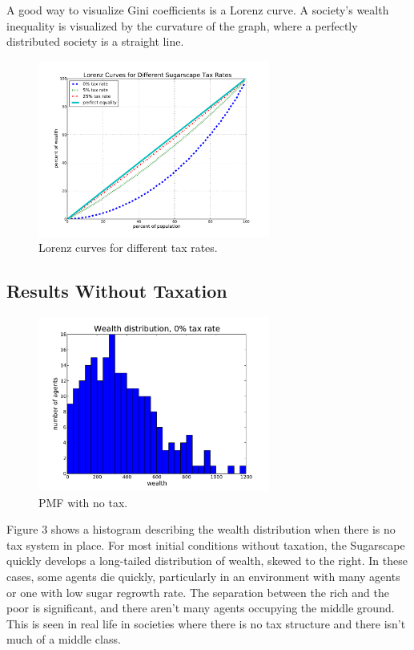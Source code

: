 A good way to visualize Gini coefficients is a Lorenz curve.  A society's wealth inequality is visualized by the curvature of the graph, where a perfectly distributed society is a straight line.

\begin{figure}[ht]
\centering
\includegraphics[width=3.0in]{figs/lorenz.pdf}
\caption{Lorenz curves for different tax rates.}
\end{figure}

\subsection{Results Without Taxation}

\begin{figure}[ht]
\centering
\includegraphics[width=3.0in]{figs/pmf_notax.pdf}
\caption{PMF with no tax.}
\end{figure}

Figure 3 shows a histogram describing the wealth distribution when there is no tax system in place. For most initial conditions without taxation, the Sugarscape quickly develops a long-tailed distribution of wealth, skewed to the right. In these cases, some agents die quickly, particularly in an environment with many agents or one with low sugar regrowth rate. The separation between the rich and the poor is significant, and there aren't many agents occupying the middle ground. This is seen in real life in societies where there is no tax structure and there isn't much of a middle class.

